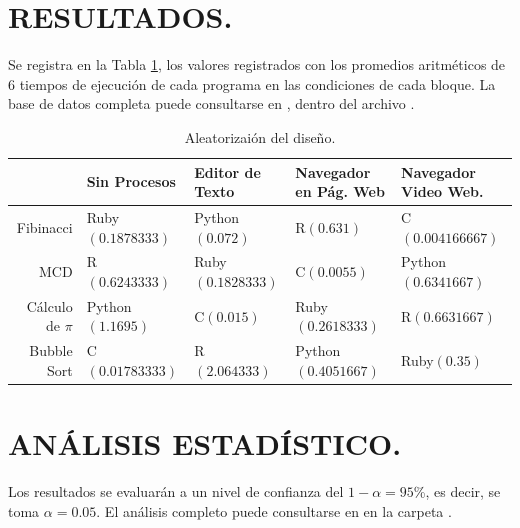 \documentclass[11pt,a4paper]{article}
\begin{document}
\section{RESULTADOS.} %
\label{sec:resultados}
Se registra en la Tabla \ref{tab:resultados}, los valores registrados con los promedios aritméticos de \(6\) tiempos de ejecución de cada programa en las condiciones de cada bloque.
La base de datos completa puede consultarse en , dentro del archivo .
\begin{table}[hbt!]
	\centering
	\footnotesize 
	\begin{tabular}{|r|*{4}{l|}}
		\hline 
		& Sin Procesos &	Editor de Texto &	Navegador en Pág. Web & Navegador Video Web. \\ \hline
		Fibinacci & Ruby\((0.1878333)\) &  Python\((0.072)\) &  R\((0.631)\) &  C\((0.004166667)\)\\
		MCD & R\((0.6243333)\) &  Ruby\((0.1828333)\) &  C\((0.0055)\) &  Python\((0.6341667)\)\\
		Cálculo de \(\pi\) & Python\((1.1695)\) &  C\((0.015)\) &  Ruby\((0.2618333)\) &  R\((0.6631667)\)\\
		Bubble Sort & C\((0.01783333)\) &  R\((2.064333)\) &  Python\((0.4051667)\) &  Ruby\((0.35)\) \\ \hline
	\end{tabular}
	\caption{Aleatorizaión del diseño.} 
	\label{tab:resultados}
\end{table}

\section{ANÁLISIS ESTADÍSTICO.} %

Los resultados se evaluarán a un nivel de confianza del \(1- \alpha = 95\)\textsc{\%}, es decir, se toma \(\alpha = 0.05\).
El análisis completo puede consultarse en  en la carpeta .
\end{document}
